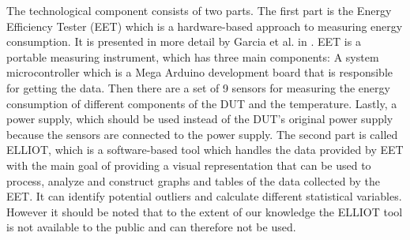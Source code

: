 The technological component consists of two parts. The first part is the Energy Efficiency Tester (EET) which is a hardware-based approach to measuring energy consumption. It is presented in more detail by Garcia et al. in \cite*{GarciaEET}. EET is a portable measuring instrument, which has three main components: A system microcontroller which is a Mega Arduino development board that is responsible for getting the data. Then there are a set of 9 sensors for measuring the energy consumption of different components of the DUT and the temperature. Lastly, a power supply, which should be used instead of the DUT's original power supply because the sensors are connected to the power supply.\cite*{GarciaEET} The second part is called ELLIOT, which is a software-based tool which handles the data provided by EET with the main goal of providing a visual representation that can be used to process, analyze and construct graphs and tables of the data collected by the EET. It can identify potential outliers and calculate different statistical variables.\cite{GarciaFEETINGS} However it should be noted that to the extent of our knowledge the ELLIOT tool is not available to the public and can therefore not be used.

